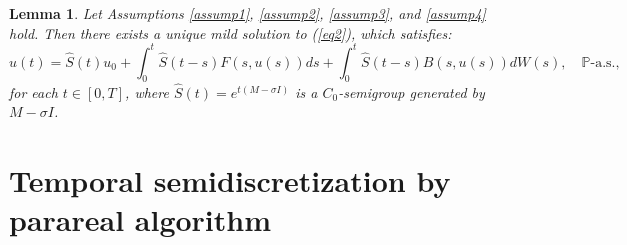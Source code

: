 \documentclass[preprint,12pt]{elsarticle}
\newtheorem{lemma}{Lemma}%
\begin{document}
	\begin{lemma}\label{lemma2}\citep{Chenetal2023}
		Let Assumptions \ref{assump1}, \ref{assump2}, \ref{assump3}, and \ref{assump4} hold. Then there exists a unique mild solution to (\ref{eq2}), which satisfies:
		\begin{equation*}
			u(t) = \widehat{S}(t) u_0 + \int_0^t \widehat{S}(t - s) F(s, u(s)) ds + \int_0^t \widehat{S}(t - s) B(s, u(s)) dW(s), \quad \mathbb{P}\text{-a.s.},
		\end{equation*}
		for each \( t \in [0,T] \), where \( \widehat{S}(t) = e^{t(M - \sigma I)} \) is a \( C_0 \)-semigroup generated by \( M - \sigma I \).
	\end{lemma}
	\section{Temporal semidiscretization by parareal algorithm} \label{sec3}
\end{document}
